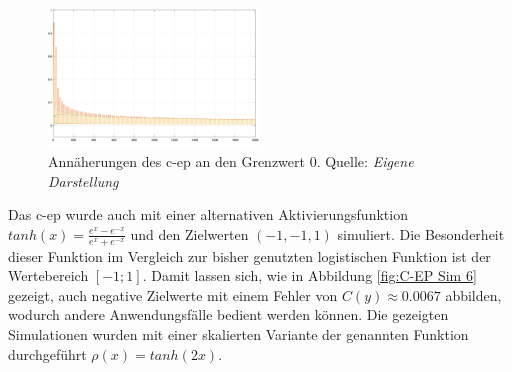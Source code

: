 \begin{figure}[h]
  \centering
  \includegraphics[width=0.5\textwidth]{abbildungen/c_ep_sim_5_ausgabe.png}
  \caption{Annäherungen des \ac{c-ep} an den Grenzwert \(0\). Quelle: \textit{Eigene Darstellung}}
  \label{fig:C-EP Sim 5}
\end{figure}

Das \ac{c-ep} wurde auch mit einer alternativen Aktivierungsfunktion \(tanh(x)=\frac{e^x-e^{-x}}{e^x+e^{-x}}\) und den Zielwerten \((-1,-1,1)\) simuliert. Die Besonderheit dieser Funktion im Vergleich zur bisher genutzten logistischen Funktion ist der Wertebereich \([-1;1]\). Damit lassen sich, wie in Abbildung \ref{fig:C-EP Sim 6} gezeigt, auch negative Zielwerte mit einem Fehler von \(C(y)\approx0.0067\) abbilden, wodurch andere Anwendungsfälle bedient werden können. Die gezeigten Simulationen wurden mit einer skalierten Variante der genannten Funktion durchgeführt \(\rho(x)=tanh(2x)\).

